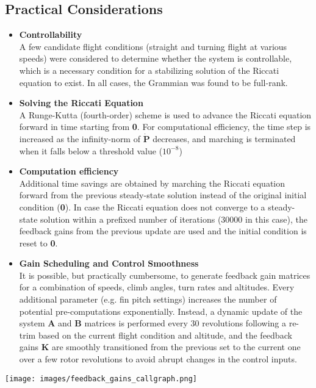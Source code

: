 \subsection{Practical Considerations}
\begin{itemize}
\item \textbf{Controllability} \\
A few candidate flight conditions (straight and turning flight at various speeds) were considered to determine whether the system is controllable, which is a necessary condition for a stabilizing solution of the Riccati equation to exist. In all cases, the Grammian was found to be full-rank. 
\item \textbf{Solving the Riccati Equation} \\
A Runge-Kutta (fourth-order) scheme is used to advance the Riccati equation forward in time starting from \textbf{0}. For computational efficiency, the time step is increased as the infinity-norm of $\dot{\textbf{P}}$ decreases, and marching is terminated when it falls below a threshold value ($10^{-8}$)
\item \textbf{Computation efficiency} \\
Additional time savings are obtained by marching the Riccati equation forward from the previous steady-state solution instead of the original initial condition (\textbf{0}). In case the Riccati equation does not converge to a steady-state solution within a prefixed number of iterations (30000 in this case), the feedback gains from the previous update are used and the initial condition is reset to \textbf{0}.
\item \textbf{Gain Scheduling and Control Smoothness} \\
It is possible, but practically cumbersome, to generate feedback gain matrices for a combination of speeds, climb angles, turn rates and altitudes. Every additional parameter (e.g. fin pitch settings) increases the number of potential pre-computations exponentially. Instead, a dynamic update of the system \textbf{A} and \textbf{B} matrices is performed every 30 revolutions following a re-trim based on the current flight condition and altitude, and the feedback gains \textbf{K} are smoothly transitioned from the previous set to the current one over a few rotor revolutions to avoid abrupt changes in the control inputs.
\end{itemize}

\begin{Figure}
 \centering
 \texttt{[image: images/feedback\_gains\_callgraph.png]}
 \vspace{-0.5cm}
 \label{fig:cg}
\end{Figure}

